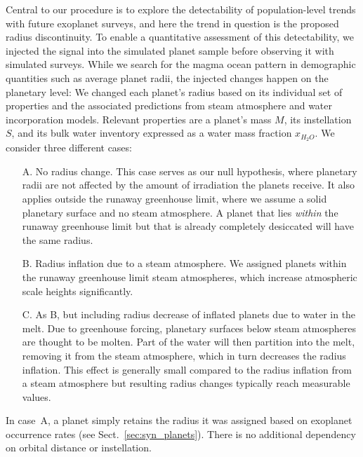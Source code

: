 \documentclass[modern]{aastex631}
\begin{document}
    Central to our procedure is to explore the detectability of population-level trends with future exoplanet surveys, and here the trend in question is the proposed radius discontinuity.
    To enable a quantitative assessment of this detectability, we injected the signal into the simulated planet sample before observing it with simulated surveys.
    While we search for the magma ocean pattern in demographic quantities such as average planet radii, the injected changes happen on the planetary level: We changed each planet's radius based on its individual set of properties and the associated predictions from steam atmosphere and water incorporation models.
    Relevant properties are a planet's mass $M$, its instellation $S$, and its bulk water inventory expressed as a water mass fraction $x_{H_2O}$.
    We consider three different cases:
    \begin{itemize}
   \item[A.] No radius change.
    This case serves as our null hypothesis, where planetary radii are not affected by the amount of irradiation the planets receive.
    It also applies outside the runaway greenhouse limit, where we assume a solid planetary surface and no steam atmosphere.
        A planet that lies \textit{within} the runaway greenhouse limit but that is already completely desiccated will have the same radius. 
   \item[B.] Radius inflation due to a steam atmosphere.
    We assigned planets within the runaway greenhouse limit steam atmospheres, which increase atmospheric scale heights significantly.
   \item[C.] As B, but including radius decrease of inflated planets due to water in the melt.
    Due to greenhouse forcing, planetary surfaces below steam atmospheres are thought to be molten.
    Part of the water will then partition into the melt, removing it from the steam atmosphere, which in turn decreases the radius inflation.
    This effect is generally small compared to the radius inflation from a steam atmosphere but resulting radius changes typically reach measurable values.
    \end{itemize}


In case~A, a planet simply retains the radius it was assigned based on exoplanet occurrence rates (see Sect.~\ref{sec:syn_planets}).
There is no additional dependency on orbital distance or instellation.
\end{document}
